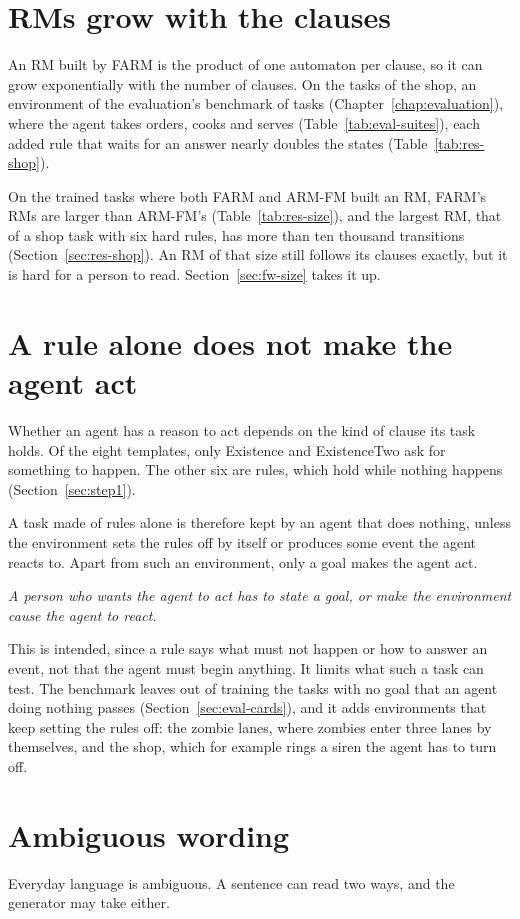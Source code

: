 \documentclass[11pt,english,listoffigures,listoftables]{tfgetsinf}
\newcommand{\keyidea}[1]{\par\smallskip\noindent\hspace*{0.6em}{\color{gray!55}\vrule width 1.5pt}\hspace{8pt}\parbox[t]{\dimexpr\linewidth-0.6em-9.5pt\relax}{\itshape #1}\par\smallskip}  %
\begin{document}
\section{RMs grow with the clauses}
\label{sec:lim-size}
An RM built by FARM is the product of one automaton per clause, so it can grow exponentially with the number of clauses. On the tasks of the shop, an environment of the evaluation's benchmark of tasks (Chapter~\ref{chap:evaluation}), where the agent takes orders, cooks and serves (Table~\ref{tab:eval-suites}), each added rule that waits for an answer nearly doubles the states (Table~\ref{tab:res-shop}). 

On the trained tasks where both FARM and ARM-FM built an RM, FARM's RMs are larger than ARM-FM's (Table~\ref{tab:res-size}), and the largest RM, that of a shop task with six hard rules, has more than ten thousand transitions (Section~\ref{sec:res-shop}). An RM of that size still follows its clauses exactly, but it is hard for a person to read. Section~\ref{sec:fw-size} takes it up.

\section{A rule alone does not make the agent act}
\label{sec:lim-rules}
Whether an agent has a reason to act depends on the kind of clause its task holds. Of the eight templates, only Existence and ExistenceTwo ask for something to happen. The other six are rules, which hold while nothing happens (Section~\ref{sec:step1}).

A task made of rules alone is therefore kept by an agent that does nothing, unless the environment sets the rules off by itself or produces some event the agent reacts to. Apart from such an environment, only a goal makes the agent act.

\keyidea{A person who wants the agent to act has to state a goal, or make the environment cause the agent to react.}

This is intended, since a rule says what must not happen or how to answer an event, not that the agent must begin anything. It limits what such a task can test. The benchmark leaves out of training the tasks with no goal that an agent doing nothing passes (Section~\ref{sec:eval-cards}), and it adds environments that keep setting the rules off: the zombie lanes, where zombies enter three lanes by themselves, and the shop, which for example rings a siren the agent has to turn off.


\section{Ambiguous wording}
\label{sec:lim-ambiguous}
Everyday language is ambiguous. A sentence can read two ways, and the generator may take either.
\end{document}
